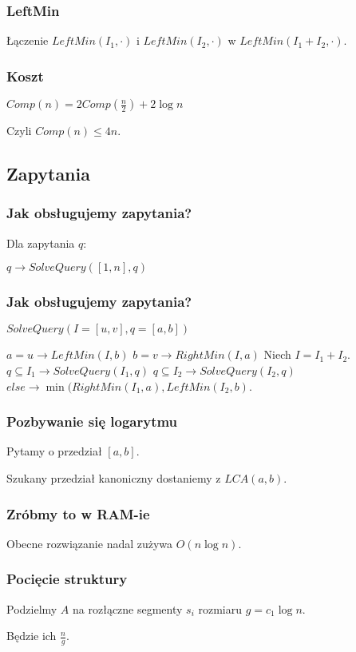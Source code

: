 \documentclass{beamer}
\begin{document}
\begin{frame} \frametitle{LeftMin}
 Łączenie $LeftMin(I_1,\cdot)$ i $LeftMin(I_2,\cdot)$ w $LeftMin(I_1 + I_2,\cdot)$.
\end{frame}

\begin{frame} \frametitle{Koszt}
 $Comp(n) = 2 Comp(\frac{n}{2}) + 2 \log n$
 
 Czyli $Comp(n) \leq 4 n$.
\end{frame}

\subsection{Zapytania}
\begin{frame} \frametitle{Jak obsługujemy zapytania?}
 Dla zapytania $q$:
 
 $q \rightarrow SolveQuery([1,n], q)$
\end{frame}

\begin{frame} \frametitle{Jak obsługujemy zapytania?}
 $SolveQuery(I=[u,v], q=[a,b])$

 $a = u \rightarrow LeftMin(I, b)$ \linebreak
 $b = v \rightarrow RightMin(I, a)$\linebreak
 Niech $I = I_1 + I_2$.\linebreak
 $q \subseteq I_1 \rightarrow SolveQuery(I_1, q)$\linebreak
 $q \subseteq I_2 \rightarrow SolveQuery(I_2, q)$\linebreak
 $else \rightarrow \min (RightMin(I_1, a), LeftMin(I_2, b)$.
  
\end{frame}

\begin{frame} \frametitle{Pozbywanie się logarytmu}
Pytamy o przedział $[a,b]$.

Szukany przedział kanoniczny dostaniemy z $LCA(a,b)$.
\end{frame}

\begin{frame} \frametitle{Zróbmy to w RAM-ie}
 Obecne rozwiązanie nadal zużywa $O(n \log n)$.
\end{frame}

\begin{frame} \frametitle{Pocięcie struktury}
 Podzielmy $A$ na rozłączne segmenty $s_i$ rozmiaru $g = c_1 \log n$.
 
 Będzie ich $\frac{n}{g}$.
\end{frame}
\end{document}
